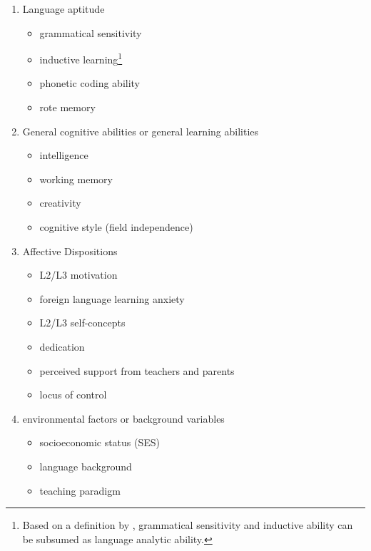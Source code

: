 \documentclass[output=paper]{langsci/langscibook}
\begin{document}
\begin{enumerate}
\item Language aptitude 

\begin{itemize}
\item grammatical sensitivity
\item inductive learning\footnote{Based on a definition by \citet{Skehan1998}, grammatical sensitivity and inductive ability can be subsumed as language analytic ability.}
\item phonetic coding ability
\item rote memory
\end{itemize}

\item General cognitive abilities or general learning abilities
\begin{itemize}
\item intelligence
\item working memory
\item creativity
\item cognitive style (field independence)
\end{itemize}

\item Affective Dispositions

\begin{itemize}
\item L2/L3 motivation
\item foreign language learning anxiety
\item L2/L3 self-concepts
\item dedication
\item perceived support from teachers and parents
\item locus of control
\end{itemize}

\item environmental factors or background variables

\begin{itemize}
\item socioeconomic status (SES)
\item language background
\item teaching paradigm 
\end{itemize}
\end{enumerate}
\end{document}
